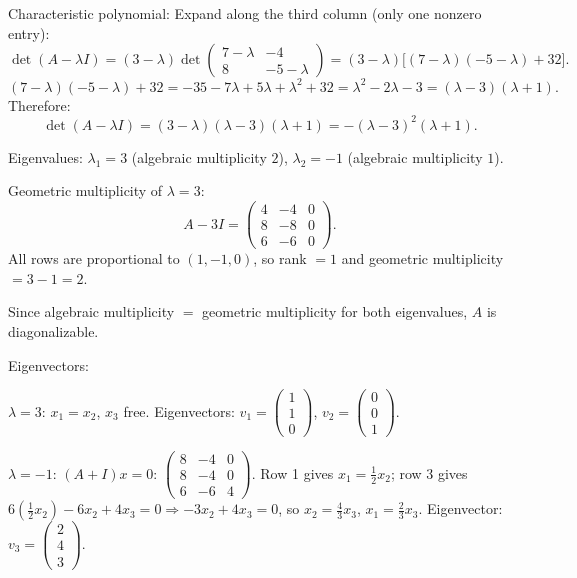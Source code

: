 \documentclass{article}
\begin{document}
\begin{mdframed}[linewidth=1pt]
\textnormal{Characteristic polynomial:}
Expand along the third column (only one nonzero entry):
\[
\det(A - \lambda I) = (3 - \lambda)\det\begin{pmatrix} 7-\lambda & -4 \\ 8 & -5-\lambda \end{pmatrix} = (3-\lambda)\bigl[(7-\lambda)(-5-\lambda) + 32\bigr].
\]
\[
(7-\lambda)(-5-\lambda) + 32 = -35 - 7\lambda + 5\lambda + \lambda^2 + 32 = \lambda^2 - 2\lambda - 3 = (\lambda - 3)(\lambda + 1).
\]
Therefore:
\[
\det(A - \lambda I) = (3-\lambda)(\lambda - 3)(\lambda + 1) = -(\lambda - 3)^2(\lambda + 1).
\]

Eigenvalues: $\lambda_1 = 3$ (algebraic multiplicity $2$), $\lambda_2 = -1$ (algebraic multiplicity $1$).

\textnormal{Geometric multiplicity of $\lambda = 3$:}
\[
A - 3I = \begin{pmatrix} 4 & -4 & 0 \\ 8 & -8 & 0 \\ 6 & -6 & 0 \end{pmatrix}.
\]
All rows are proportional to $(1, -1, 0)$, so rank $= 1$ and geometric multiplicity $= 3 - 1 = 2$.

Since algebraic multiplicity $=$ geometric multiplicity for both eigenvalues, $A$ is \textnormal{diagonalizable}.

\textnormal{Eigenvectors:}

$\lambda = 3$: $x_1 = x_2$, $x_3$ free. Eigenvectors: $v_1 = \begin{pmatrix} 1 \\ 1 \\ 0 \end{pmatrix}$, $v_2 = \begin{pmatrix} 0 \\ 0 \\ 1 \end{pmatrix}$.

$\lambda = -1$: $(A + I)x = 0$:
$\begin{pmatrix} 8 & -4 & 0 \\ 8 & -4 & 0 \\ 6 & -6 & 4 \end{pmatrix}$.
Row 1 gives $x_1 = \tfrac{1}{2}x_2$; row 3 gives $6(\tfrac{1}{2}x_2) - 6x_2 + 4x_3 = 0 \Rightarrow -3x_2 + 4x_3 = 0$, so $x_2 = \tfrac{4}{3}x_3$, $x_1 = \tfrac{2}{3}x_3$. Eigenvector: $v_3 = \begin{pmatrix} 2 \\ 4 \\ 3 \end{pmatrix}$.


\end{mdframed}
\end{document}
